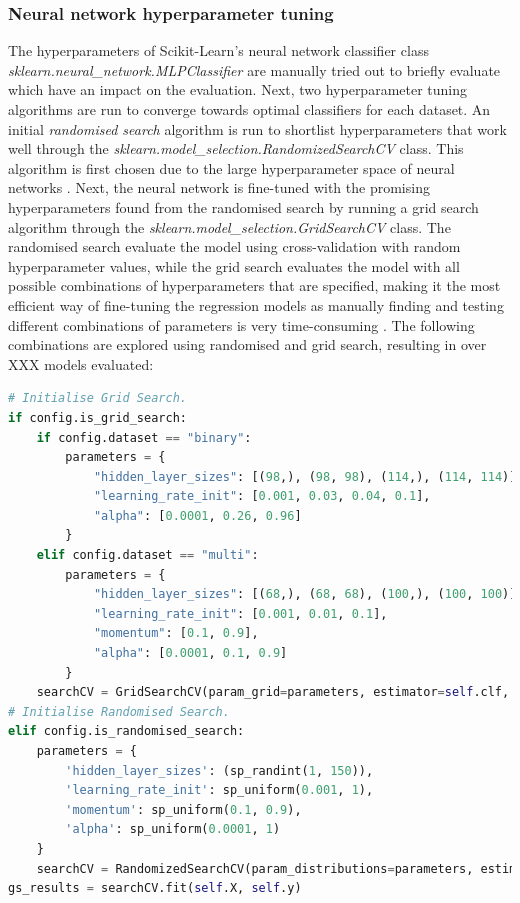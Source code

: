 \documentclass[letterpaper,12pt]{article}
\begin{document}
\subsubsection{Neural network hyperparameter tuning}

The hyperparameters of Scikit-Learn’s neural network classifier class \textit{sklearn.neural\_network.MLPClassifier} are manually tried out to briefly evaluate which have an impact on the evaluation. Next, two hyperparameter tuning algorithms are run to converge towards optimal classifiers for each dataset. An initial \textit{randomised search} algorithm is run to shortlist hyperparameters that work well through the \textit{sklearn.model\_selection.RandomizedSearchCV} class. This algorithm is first chosen due to the large hyperparameter space of neural networks \cite{Geron2019}. Next, the neural network is fine-tuned with the promising hyperparameters found from the randomised search by running a grid search algorithm through the \textit{sklearn.model\_selection.GridSearchCV} class. The randomised search evaluate the model using cross-validation with random hyperparameter values, while the grid search evaluates the model with all possible combinations of hyperparameters that are specified, making it the most efficient way of fine-tuning the regression models as manually finding and testing different combinations of parameters is very time-consuming \cite{Geron2019}. The following combinations are explored using randomised and grid search, resulting in over XXX models evaluated:

\begin{lstlisting}[language=Python]
# Initialise Grid Search.
if config.is_grid_search:
    if config.dataset == "binary":
        parameters = {
            "hidden_layer_sizes": [(98,), (98, 98), (114,), (114, 114)],
            "learning_rate_init": [0.001, 0.03, 0.04, 0.1],
            "alpha": [0.0001, 0.26, 0.96]
        }
    elif config.dataset == "multi":
        parameters = {
            "hidden_layer_sizes": [(68,), (68, 68), (100,), (100, 100)],
            "learning_rate_init": [0.001, 0.01, 0.1],
            "momentum": [0.1, 0.9],
            "alpha": [0.0001, 0.1, 0.9]
        }
    searchCV = GridSearchCV(param_grid=parameters, estimator=self.clf, cv=self.folds, scoring=scoring)
# Initialise Randomised Search.
elif config.is_randomised_search:
    parameters = {
        'hidden_layer_sizes': (sp_randint(1, 150)),
        'learning_rate_init': sp_uniform(0.001, 1),
        'momentum': sp_uniform(0.1, 0.9),
        'alpha': sp_uniform(0.0001, 1)
    }
    searchCV = RandomizedSearchCV(param_distributions=parameters, estimator=self.clf, n_iter=100, cv=self.folds, scoring=scoring)
gs_results = searchCV.fit(self.X, self.y)

\end{lstlisting}
\end{document}
